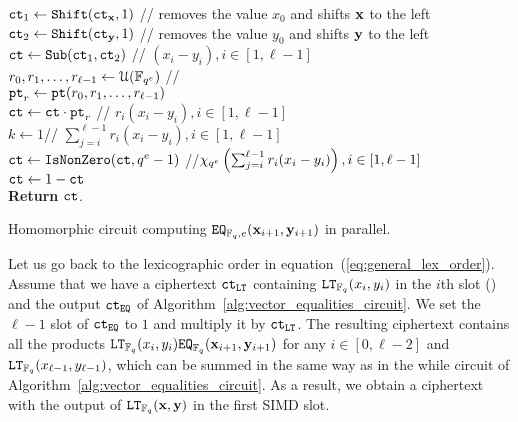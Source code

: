   \begin{algorithm}[t]
    ${\mathtt{ct}}_1 \leftarrow {\mathtt{Shift}}({\mathtt{ct}}_{\mathbf{x}}, 1)$ // removes the value $x_0$ and shifts $\mathbf{x}$ to the left\\
    ${\mathtt{ct}}_2 \leftarrow {\mathtt{Shift}}({\mathtt{ct}}_{\mathbf{y}}, 1)$ // removes the value $y_0$ and shifts $\mathbf{y}$ to the left\\
    ${\mathtt{ct}} \leftarrow {\mathtt{Sub}}({\mathtt{ct}}_1, {\mathtt{ct}}_2)$ // $(x_i - y_i), i \in [1,\ell-1]$\\
    $r_0,r_1,\dots,r_{\ell-1} \leftarrow \mathcal{U}(\mathbb{F}_{q^e})$ //\\ 
    ${\mathtt{pt}}_r \leftarrow {\mathtt{pt}}(r_0,r_1,\dots,r_{\ell-1})$\\
    ${\mathtt{ct}} \leftarrow {\mathtt{ct}} \cdot {\mathtt{pt}}_r$ // $r_i(x_i - y_i), i \in [1,\ell-1]$\\
    $k \leftarrow 1$// $\sum_{j=i}^{\ell-1} r_i(x_i - y_i), i \in [1,\ell-1]$\\
    ${\mathtt{ct}} \leftarrow {\mathtt{IsNonZero}}({\mathtt{ct}}, q^e-1)$ //$\chi_{q^e}\left(\sum_{j=i}^{\ell-1} r_i(x_i - y_i)\right), i \in [1,\ell-1]$ \\
    ${\mathtt{ct}} \leftarrow 1 - {\mathtt{ct}}$\\
    \textbf{Return} ${\mathtt{ct}}$.
    \caption{Homomorphic circuit computing $\mathtt{EQ}_{\mathbb{F}_q, e}(\mathbf{x}_{i+1},\mathbf{y}_{i+1})$ in parallel.}\label{alg:vector_equalities_circuit}
  \end{algorithm}
  
  Let us go back to the lexicographic order in equation~(\ref{eq:general_lex_order}).
  Assume that we have a ciphertext ${\mathtt{ct}}_{\mathtt{LT}}$ containing $\mathtt{LT}_{\mathbb{F}_q}(x_i, y_i)$ in the $i$th slot () and the output ${\mathtt{ct}}_{\mathtt{EQ}}$ of Algorithm~\ref{alg:vector_equalities_circuit}.
  We set the $\ell-1$ slot of ${\mathtt{ct}}_{\mathtt{EQ}}$ to $1$ and multiply it by ${\mathtt{ct}}_{\mathtt{LT}}$.
  The resulting ciphertext contains all the products $\mathtt{LT}_{\mathbb{F}_q}(x_{i}, y_{i}) \mathtt{EQ}_{\mathbb{F}_q}(\mathbf{x}_{i+1}, \mathbf{y}_{i+1})$ for any $i \in [0,\ell-2]$ and $\mathtt{LT}_{\mathbb{F}_q}(x_{\ell-1}, y_{\ell-1})$, which can be summed in the same way as in the while circuit of Algorithm~\ref{alg:vector_equalities_circuit}.
  As a result, we obtain a ciphertext with the output of $\mathtt{LT}_{\mathbb{F}_q}(\mathbf{x}, \mathbf{y})$ in the first SIMD slot.

